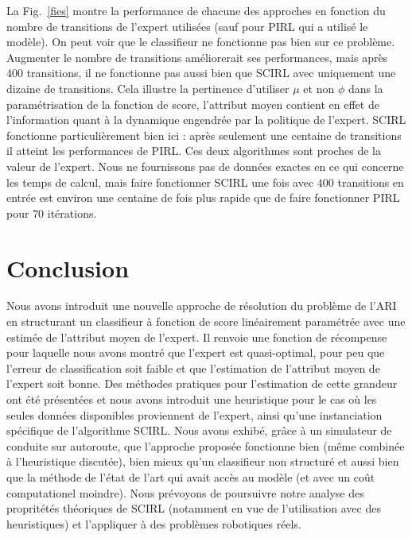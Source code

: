 \documentclass[french,utf8]{./hermes-journal}
\begin{document}
La Fig.~\ref{fies} montre la performance de chacune des approches en fonction du nombre de transitions de l'expert utilisées (sauf pour PIRL qui a utilisé le modèle). On peut voir que le classifieur ne fonctionne pas bien sur ce problème. Augmenter le nombre de transitions améliorerait ses performances, mais après 400 transitions, il ne fonctionne pas aussi bien que SCIRL avec uniquement une dizaine de transitions. Cela illustre la pertinence d'utiliser $\mu$ et non $\phi$ dans la paramétrisation de la fonction de score, l'attribut moyen contient en effet de l’information quant à la dynamique engendrée par la politique de l’expert. SCIRL fonctionne particulièrement bien ici : après seulement une centaine de transitions il atteint les performances de PIRL. Ces deux algorithmes sont proches de la valeur de l'expert. Nous ne fournissons pas de données exactes en ce qui concerne les temps de calcul, mais faire fonctionner SCIRL une fois avec $400$ transitions en entrée est environ une centaine de fois plus rapide que de faire fonctionner PIRL pour $70$ itérations.
%



\section{Conclusion}
\label{seonclusion}

Nous avons introduit une nouvelle approche de résolution du problème de l'ARI en structurant un classifieur à fonction de score linéairement paramétrée avec une estimée de l'attribut moyen de l'expert. Il renvoie une fonction de récompense pour laquelle nous avons montré que l'expert est quasi-optimal, pour peu que l'erreur de classification soit faible et que l'estimation de l'attribut moyen de l'expert soit bonne. Des méthodes pratiques pour l'estimation de cette grandeur ont été présentées et nous avons introduit une heuristique pour le cas où les seules données disponibles proviennent de l'expert, ainsi qu'une instanciation spécifique de l'algorithme SCIRL. Nous avons exhibé, grâce à un simulateur de conduite sur autoroute, que l'approche proposée fonctionne bien (même combinée à l'heuristique discutée), bien mieux qu'un classifieur non structuré et aussi bien que la méthode de l'état de l'art qui avait accès au modèle (et avec un coût computationel moindre). Nous prévoyons de poursuivre notre analyse des propritétés théoriques de SCIRL (notamment en vue de l'utilisation avec des heuristiques) et l'appliquer à des problèmes robotiques réels.


\newpage

\end{document}
